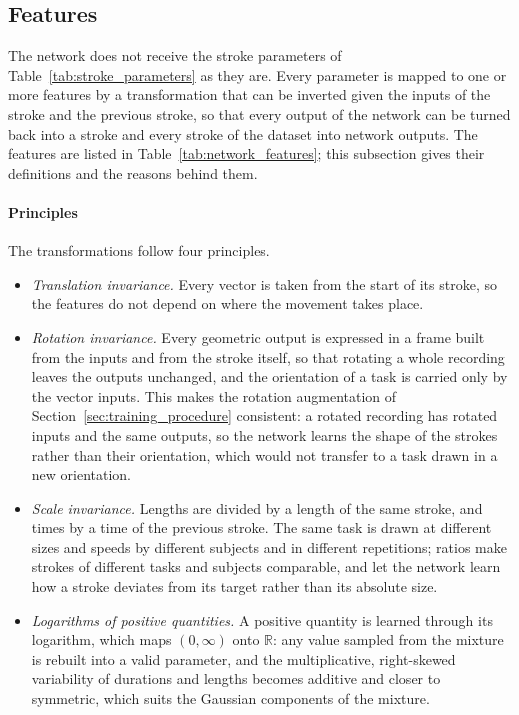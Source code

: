 \documentclass[12pt]{report}
\begin{document}
\subsection{Features}
\label{sec:features}
The network does not receive the stroke parameters of Table~\ref{tab:stroke_parameters} as they are. Every parameter is mapped to one or more features by a transformation that can be inverted given the inputs of the stroke and the previous stroke, so that every output of the network can be turned back into a stroke and every stroke of the dataset into network outputs. The features are listed in Table~\ref{tab:network_features}; this subsection gives their definitions and the reasons behind them.

\paragraph{Principles}
The transformations follow four principles.
\begin{itemize}
    \item \emph{Translation invariance.} Every vector is taken from the start of its stroke, so the features do not depend on where the movement takes place.
    \item \emph{Rotation invariance.} Every geometric output is expressed in a frame built from the inputs and from the stroke itself, so that rotating a whole recording leaves the outputs unchanged, and the orientation of a task is carried only by the vector inputs. This makes the rotation augmentation of Section~\ref{sec:training_procedure} consistent: a rotated recording has rotated inputs and the same outputs, so the network learns the shape of the strokes rather than their orientation, which would not transfer to a task drawn in a new orientation.
    \item \emph{Scale invariance.} Lengths are divided by a length of the same stroke, and times by a time of the previous stroke. The same task is drawn at different sizes and speeds by different subjects and in different repetitions; ratios make strokes of different tasks and subjects comparable, and let the network learn how a stroke deviates from its target rather than its absolute size.
    \item \emph{Logarithms of positive quantities.} A positive quantity is learned through its logarithm, which maps $(0,\infty)$ onto $\mathbb R$: any value sampled from the mixture is rebuilt into a valid parameter, and the multiplicative, right-skewed variability of durations and lengths becomes additive and closer to symmetric, which suits the Gaussian components of the mixture.
\end{itemize}
\end{document}
